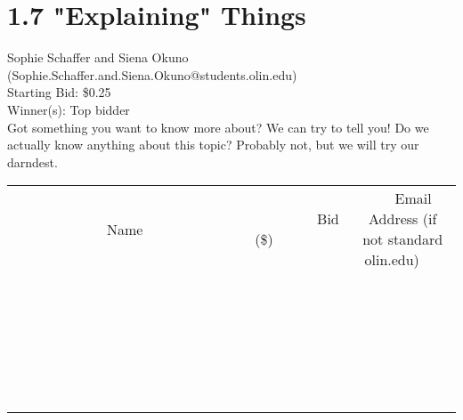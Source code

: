 \documentclass[11pt]{article}
\begin{document}
\section*{1.7 "Explaining" Things}
Sophie Schaffer and Siena Okuno (Sophie.Schaffer.and.Siena.Okuno@students.olin.edu) \\
Starting Bid: \$0.25 \\
Winner(s): 
Top bidder \\
Got something you want to know more about? We can try to tell you! Do we actually know anything about this topic? Probably not, but we will try our darndest. \\[6ex]
\begin{tabular}{c c c}
~~~~~~~~~~~~~Name~~~~~~~~~~~~~ & ~~~~~~~~~Bid (\$)~~~~~~~~~ & ~~~Email Address (if not standard olin.edu)~~~ \\
 & & \\
\hline
 & & \\
\hline
 & & \\
\hline
 & & \\
\hline
 & & \\
\hline
 & & \\
\hline
 & & \\
\hline
 & & \\
\hline
 & & \\
\hline
 & & \\
\hline
 & & \\
\hline
 & & \\
\hline
 & & \\
\hline
 & & \\
\hline
 & & \\
\hline
 & & \\
\hline
 & & \\
\hline
 & & \\
\hline
 & & \\
\hline
 & & \\
\hline
 & & \\
\hline
 & & \\
\hline
 & & \\
\hline
 & & \\
\hline
 & & \\
\hline
 & & \\
\hline
\end{tabular}
\clearpage
\end{document}
